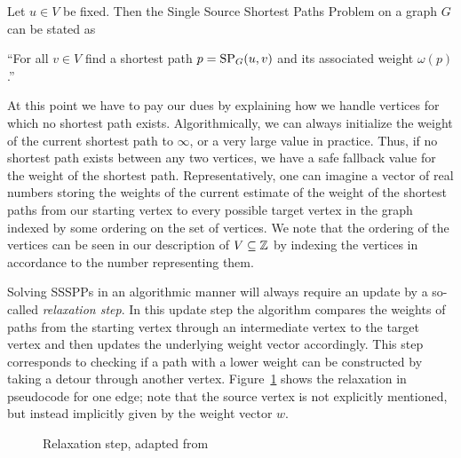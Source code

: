 \begin{definition}\label{def:ssspps}
    Let $u \in V$ be fixed. Then the Single Source Shortest Paths Problem on a graph $G$ can be stated as
    \begin{displayquote}
        ``For all $v \in V$ find a shortest path $p = \operatorname{SP}_G(u, v)$ and its associated weight $\omega(p)$.''
    \end{displayquote}
\end{definition}

At this point we have to pay our dues by explaining how we handle vertices for which no shortest path exists.
Algorithmically, we can always initialize the weight of the current shortest path to $\infty$, or a very large value in practice.
Thus, if no shortest path exists between any two vertices, we have a safe fallback value for the weight of the shortest path.
Representatively, one can imagine a vector of real numbers storing the weights of the current estimate of the weight of the shortest paths from our starting vertex to every possible target vertex in the graph indexed by some ordering on the set of vertices.
We note that the ordering of the vertices can be seen in our description of $V \subseteq \mathbb{Z}$ by indexing the vertices in accordance to the number representing them.

Solving SSSPPs in an algorithmic manner will always require an update by a so-called \emph{relaxation step}.
In this update step the algorithm compares the weights of paths from the starting vertex through an intermediate vertex to the target vertex and then updates the underlying weight vector accordingly.
This step corresponds to checking if a path with a lower weight can be constructed by taking a detour through another vertex.
Figure~\ref{alg:relaxation} shows the relaxation in pseudocode for one edge; note that the source vertex is not explicitly mentioned, but instead implicitly given by the weight vector $w$.

\begin{figure}[ht]
    \centering
    \begin{minipage}{.4\textwidth}
        \begin{algorithm}[H]
        \end{algorithm}
    \end{minipage}
    \caption{Relaxation step, adapted from~\cite[Chapter~24]{Cormen2001}\label{alg:relaxation}}
\end{figure}

